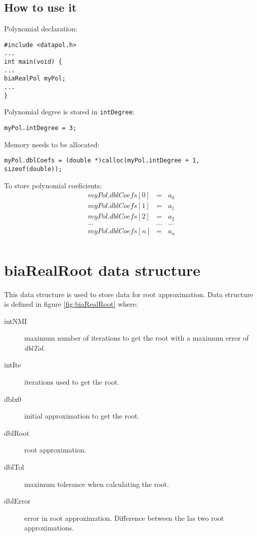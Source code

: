 \subsection{How to use it}

Polynomial declaration:
%
\begin{verbatim}
#include <datapol.h>
...
int main(void) {
...
biaRealPol myPol;
...
}
\end{verbatim}
%
Polynomial degree is stored in \texttt{intDegree}:
%
\begin{verbatim}
myPol.intDegree = 3;  
\end{verbatim}
%
Memory needs to be allocated:
%
\begin{verbatim}
myPol.dblCoefs = (double *)calloc(myPol.intDegree + 1, sizeof(double));  
\end{verbatim}


To store polynomial coeficients:
%
\begin{eqnarray*}
myPol.dblCoefs[0] & = & a_0 \\
myPol.dblCoefs[1] & = & a_1 \\
myPol.dblCoefs[2] & = & a_2 \\
... & ... & ... \\
myPol.dblCoefs[n] & = & a_n \\
\end{eqnarray*}


\section{\textbf{biaRealRoot} data structure} \label{sec:biaRealRoot}

This data structure is used to store data for root approximation. Data structure is defined in figure \ref{fig:biaRealRoot} where:

\begin{description}
\item[intNMI] maximum number of iterations to get the root with a maximum error of \emph{dblTol}.
\item[intIte] iterations used to get the root.
\item[dblx0] initial approximation to get the root.
\item[dblRoot] root approximation.
\item[dblTol] maximum tolerance when calculating the root.
\item[dblError] error in root approximation. Difference between the las two root approximations.
\end{description}

